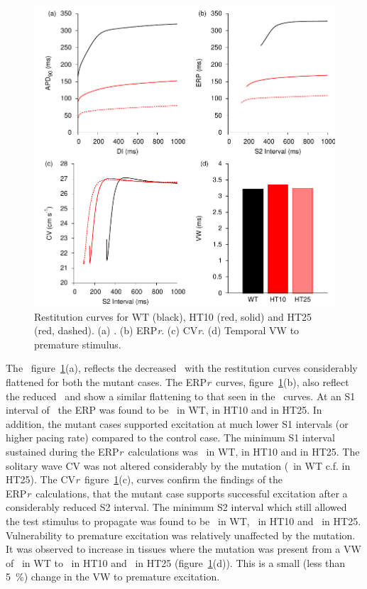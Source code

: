\begin{figure}
\includegraphics{figures/atrium/iks/figures/03_REST}
\caption[Restitution properties with S140G mutation]{
\label{atrium:iks:apdretal}
Restitution curves for WT (black), HT10 (red, solid) and HT25 (red, dashed).
(a) \apdr.
(b) ERP\emph{r}.
(c) CV\emph{r}.
(d) Temporal VW to premature stimulus.
}
\end{figure}

The \apdr\, figure~\ref{atrium:iks:apdretal}(a), reflects the decreased \apd\ with
the restitution curves considerably flattened for both the mutant cases.
The ERP\emph{r}\ curves, figure~\ref{atrium:iks:apdretal}(b), also reflect the
reduced \apd\ and show a similar flattening to that seen in the \apdr\ curves.
At an S1 interval of \ the ERP was found to be \ in WT,
 in HT10 and  in HT25.
In addition, the mutant cases supported excitation at much lower S1 intervals
(or higher pacing rate) compared to the control case.
The minimum S1 interval sustained during the ERP\emph{r}\ calculations was
\ in WT,  in HT10 and  in HT25.
The solitary wave CV was not altered considerably by the mutation (\
in WT c.f.  in HT25).
The CV\emph{r}\, figure~\ref{atrium:iks:apdretal}(c), curves confirm the findings
of the ERP\emph{r}\ calculations, that the mutant case supports successful
excitation after a considerably reduced S2 interval.
The minimum S2 interval which still allowed the test stimulus to propagate was
found to be \ms{317.1}\ in WT, \ms{151.7}\ in HT10 and \ms{92.5}\ in HT25.
Vulnerability to premature excitation was relatively unaffected by the mutation.
It was observed to increase in tissues where the mutation was present from a VW of
\ms{3.2}\ in WT to \ms{3.4}\ in HT10 and \ms{3.3}\ in HT25
(figure~\ref{atrium:iks:apdretal}(d)).
This is a small (less than 5~\%) change in the VW to premature excitation.


